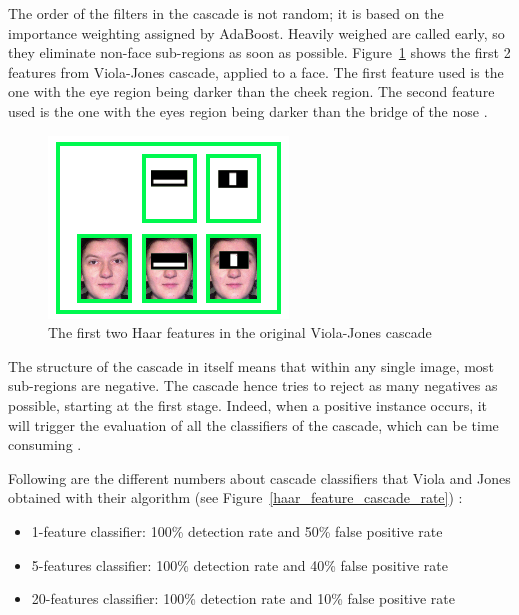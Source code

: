 \noindent The order of the filters in the cascade is not random; it is based on the importance weighting assigned by AdaBoost. Heavily weighed are called early, so they eliminate non-face sub-regions as soon as possible. Figure~\ref{haar_feature_first_2_features} shows the first 2 features from Viola-Jones cascade, applied to a face. The first feature used is the one with the eye region being darker than the cheek region. The second feature used is the one with the eyes region being darker than the bridge of the nose \cite{HEW07}.
\newline

\begin{figure}[!h]
\begin{center}
\noindent \includegraphics[scale=0.9]{figures/haar_feature_first_2_features} 
\newline
\caption{The first two Haar features in the original Viola-Jones cascade}
\label{haar_feature_first_2_features}
\end{center} 
\end{figure}

\noindent The structure of the cascade in itself means that within any single image, most sub-regions are negative. The cascade hence tries to reject as many negatives as possible, starting at the first stage. Indeed, when a positive instance occurs, it will trigger the evaluation of all the classifiers of the cascade, which can be time consuming \cite{VIO01}.
\newline

\noindent Following are the different numbers about cascade classifiers that Viola and Jones obtained with their algorithm (see Figure~\ref{haar_feature_cascade_rate}) \cite{UBC01}:

\begin{itemize}
  \item 1-feature classifier: 100\% detection rate and 50\% false positive rate
  \item 5-features classifier: 100\% detection rate and 40\% false positive rate 
  \item 20-features classifier: 100\% detection rate and 10\% false positive rate
\end{itemize}

